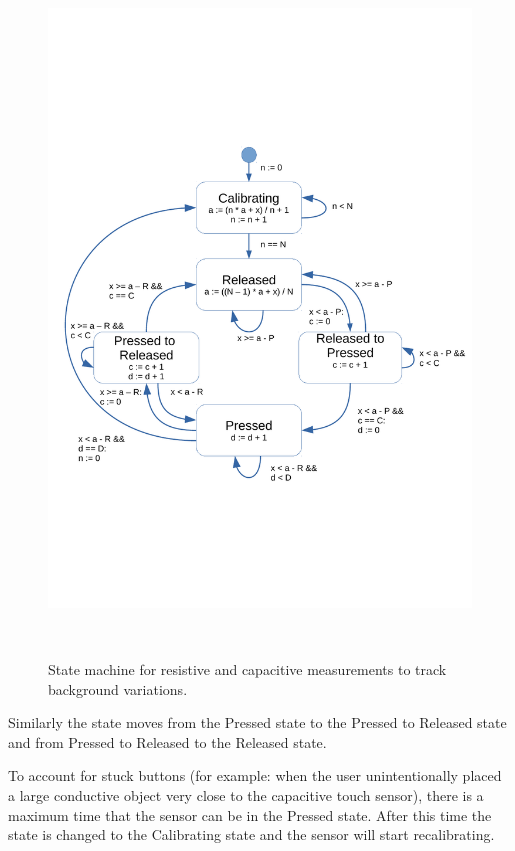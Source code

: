 \documentclass{sigchi-ext}
\begin{document}
\begin{figure}
\centering
\includegraphics[trim={0 6.2cm 0 6.8cm},clip,width=0.9\columnwidth]{figures/state_machine}
 \caption{State machine for resistive and capacitive measurements to track
background variations.}~\label{fig:state_machine}
\end{figure}

Similarly the state moves from the Pressed state to the Pressed to Released
state and from Pressed to Released to the Released state.

To account for stuck buttons (for example: when the user unintentionally placed
a large conductive object very close to the capacitive touch sensor), there is a
maximum time that the sensor can be in the Pressed state. After this time the
state is changed to the Calibrating state and the sensor will start
recalibrating.
\end{document}

